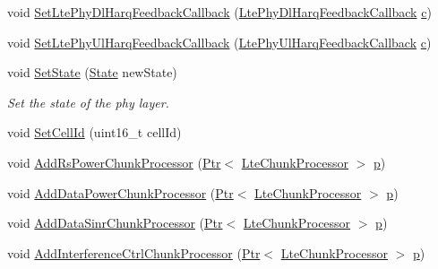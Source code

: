 \begin{DoxyCompactItemize}
\item 
void \hyperlink{classns3_1_1LteSpectrumPhy_a9d548065bf32f1a6ad95a2cf7c975600}{Set\+Lte\+Phy\+Dl\+Harq\+Feedback\+Callback} (\hyperlink{namespacens3_af03b82938a46f6bddebfb63ec3b0f93c}{Lte\+Phy\+Dl\+Harq\+Feedback\+Callback} \hyperlink{mmwave_2model_2fading-traces_2fading__trace__generator_8m_ae0323a9039add2978bf5b49550572c7c}{c})
\item 
void \hyperlink{classns3_1_1LteSpectrumPhy_a756c90fe8e187f5394774b88e2322b2b}{Set\+Lte\+Phy\+Ul\+Harq\+Feedback\+Callback} (\hyperlink{namespacens3_acc408d565410d696cf016f2d4ead8d2a}{Lte\+Phy\+Ul\+Harq\+Feedback\+Callback} \hyperlink{mmwave_2model_2fading-traces_2fading__trace__generator_8m_ae0323a9039add2978bf5b49550572c7c}{c})
\item 
void \hyperlink{classns3_1_1LteSpectrumPhy_a13fa503d52656839a9e25ef5a973e426}{Set\+State} (\hyperlink{classns3_1_1LteSpectrumPhy_a52ce2cf9b4846807449c50399f6b8000}{State} new\+State)
\begin{DoxyCompactList}\small\item\em Set the state of the phy layer. \end{DoxyCompactList}\item 
void \hyperlink{classns3_1_1LteSpectrumPhy_afc1f994c937d0b97a7454d41e5f48da2}{Set\+Cell\+Id} (uint16\+\_\+t cell\+Id)
\item 
void \hyperlink{classns3_1_1LteSpectrumPhy_ad21e42e3b2e2dfd86757ccb2c66db980}{Add\+Rs\+Power\+Chunk\+Processor} (\hyperlink{classns3_1_1Ptr}{Ptr}$<$ \hyperlink{classns3_1_1LteChunkProcessor}{Lte\+Chunk\+Processor} $>$ \hyperlink{lte__link__budget__x2__handover__measures_8m_ac9de518908a968428863f829398a4e62}{p})
\item 
void \hyperlink{classns3_1_1LteSpectrumPhy_a33968887e4ee42f68ba7718f48081d9d}{Add\+Data\+Power\+Chunk\+Processor} (\hyperlink{classns3_1_1Ptr}{Ptr}$<$ \hyperlink{classns3_1_1LteChunkProcessor}{Lte\+Chunk\+Processor} $>$ \hyperlink{lte__link__budget__x2__handover__measures_8m_ac9de518908a968428863f829398a4e62}{p})
\item 
void \hyperlink{classns3_1_1LteSpectrumPhy_a220b6854576a4ff77ac55c7d13235a27}{Add\+Data\+Sinr\+Chunk\+Processor} (\hyperlink{classns3_1_1Ptr}{Ptr}$<$ \hyperlink{classns3_1_1LteChunkProcessor}{Lte\+Chunk\+Processor} $>$ \hyperlink{lte__link__budget__x2__handover__measures_8m_ac9de518908a968428863f829398a4e62}{p})
\item 
void \hyperlink{classns3_1_1LteSpectrumPhy_ae81b3122d093f5863a1a464bdbbc6bd5}{Add\+Interference\+Ctrl\+Chunk\+Processor} (\hyperlink{classns3_1_1Ptr}{Ptr}$<$ \hyperlink{classns3_1_1LteChunkProcessor}{Lte\+Chunk\+Processor} $>$ \hyperlink{lte__link__budget__x2__handover__measures_8m_ac9de518908a968428863f829398a4e62}{p})

\end{DoxyCompactItemize}
